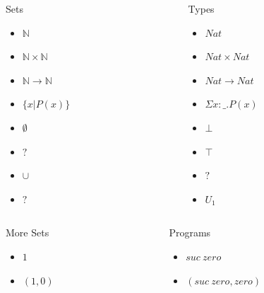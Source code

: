 \documentclass[10pt]{beamer}
\begin{document}
\begin{frame}
\begin{columns}

\begin{column}{0.4 \textwidth}
\begin{exampleblock}{Sets}
  \begin{itemize}
    \item $\mathbb{N}$
    \item $\mathbb{N} \times \mathbb{N}$
    \item $\mathbb{N} \to \mathbb{N}$
    \item $\{x|P(x)\}$
    \item $\emptyset$
    \item $?$
    \item $\cup$
    \item $?$
  \end{itemize}
\end{exampleblock}
\end{column}

\begin{column}{0.4 \textwidth}
\begin{block}{Types}
  \begin{itemize}
    \item $Nat$
    \item $Nat \times Nat$
    \item $Nat \to Nat$
    \item $\Sigma x : \_ . P(x)$
    \item $\bot$
    \item $\top$
    \item $?$
    \item $U_1$
  \end{itemize}
\end{block}
\end{column}
\end{columns}

\begin{columns}

\begin{column}{0.4 \textwidth}
\begin{exampleblock}{More Sets}
  \begin{itemize}
    \item $1$
    \item $(1,0)$
  \end{itemize}
\end{exampleblock}
\end{column}

\begin{column}{0.4 \textwidth}
\begin{block}{Programs}
  \begin{itemize}
    \item $suc\ zero$
    \item $(suc\ zero, zero)$
  \end{itemize}
\end{block}
\end{column}
\end{columns}

\end{frame}
\end{document}
